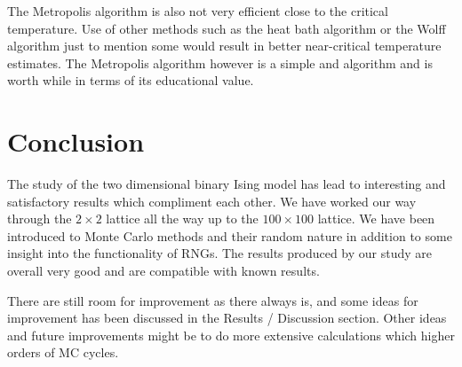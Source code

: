 \documentclass[a4paper, 10pt, reqno]{amsart}
\begin{document}
The Metropolis algorithm is also not very efficient close to the critical temperature. Use of other methods such as the heat bath algorithm or the Wolff algorithm just to mention some would result in better near-critical temperature estimates. The Metropolis algorithm however is a simple and algorithm and is worth while in terms of its educational value.

\section{Conclusion}
The study of the two dimensional binary Ising model has lead to interesting and satisfactory results which compliment each other. We have worked our way through the $2\times 2$ lattice all the way up to the $100 \times 100$ lattice. We have been introduced to Monte Carlo methods and their random nature in addition to some insight into the functionality of RNGs. The results produced by our study are overall very good and are compatible with known results. 

There are still room for improvement as there always is, and some ideas for improvement has been discussed in the Results / Discussion section. Other ideas and future improvements might be to do more extensive calculations which higher orders of MC cycles. 

\nocite{*}
{}

\end{document}
